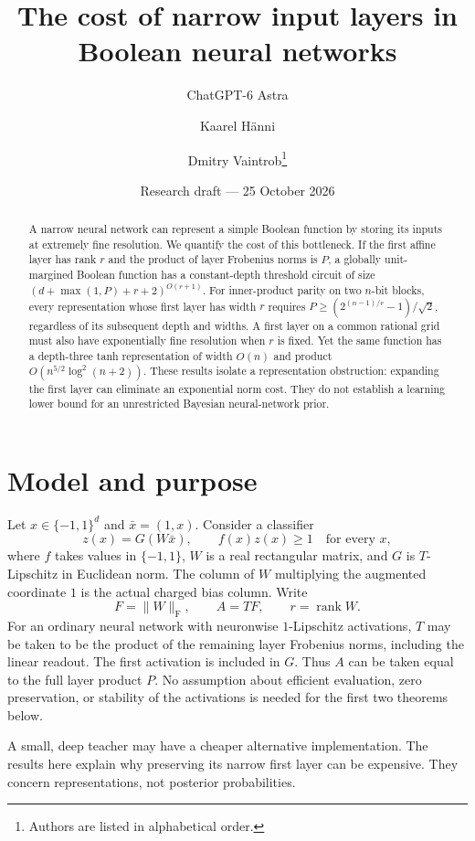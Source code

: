 \documentclass[11pt]{article}
\title{The cost of narrow input layers in Boolean neural networks}
\author{ChatGPT-6 Astra \and Kaarel H\"anni \and Dmitry Vaintrob\thanks{Authors are listed in alphabetical order.}}
\date{Research draft --- 25 October 2026}
\theoremstyle{remark}\newtheorem{remark}[theorem]{Remark}
\newcommand{\F}{\mathrm F}
\newcommand{\norm}[1]{\lVert #1\rVert}
\begin{document}
\maketitle
\begin{abstract}
A narrow neural network can represent a simple Boolean function by storing
its inputs at extremely fine resolution. We quantify the cost of this
bottleneck. If the first affine layer has rank $r$ and the product of layer
Frobenius norms is $P$, a globally unit-margined Boolean function has a
constant-depth threshold circuit of size $(d+\max(1,P)+r+2)^{O(r+1)}$.
For inner-product parity on two $n$-bit blocks, every representation whose
first layer has width $r$ requires $P\ge(2^{(n-1)/r}-1)/\sqrt2$, regardless
of its subsequent depth and widths. A first layer on a common rational
grid must also have exponentially fine resolution when $r$ is fixed.
Yet the same function has a depth-three tanh representation of width
$O(n)$ and product $O(n^{5/2}\log^2(n+2))$. These results isolate a
representation obstruction: expanding the first layer can eliminate an
exponential norm cost. They do not establish a learning lower bound for
an unrestricted Bayesian neural-network prior.
\end{abstract}

\section{Model and purpose}
Let $x\in\{-1,1\}^d$ and $\bar x=(1,x)$. Consider a classifier
\begin{equation}\label{eq:model}
 z(x)=G(W\bar x),\qquad f(x)z(x)\ge1\quad\text{for every }x,
\end{equation}
where $f$ takes values in $\{-1,1\}$, $W$ is a real rectangular matrix,
and $G$ is $T$-Lipschitz in Euclidean norm. The column of $W$ multiplying the augmented coordinate $1$
is the actual charged bias column. Write
\[
 F=\norm W_\F,\qquad A=TF,\qquad r=\operatorname{rank}W.
\]
For an ordinary neural network with neuronwise $1$-Lipschitz activations,
$T$ may be taken to be the product of the remaining layer Frobenius norms,
including the linear readout. The first activation is included in $G$.
Thus $A$ can be taken equal to the full layer product $P$.
No assumption about efficient evaluation, zero preservation, or
stability of the activations is needed for the first two theorems below.

A small, deep teacher may have a cheaper alternative implementation.
The results here explain why preserving its narrow first layer can be
expensive. They concern representations, not posterior probabilities.
\end{document}

